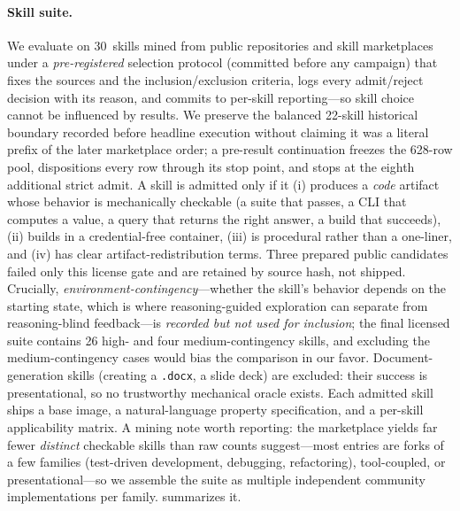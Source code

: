 \documentclass[acmsmall,screen,review,anonymous]{acmart}
\newcommand{\NumSkills}{30}                  %
\begin{document}
\paragraph{Skill suite.} We evaluate on \NumSkills\ skills mined from public
repositories and skill marketplaces under a \emph{pre-registered} selection protocol
(committed before any campaign) that fixes the sources and the inclusion/exclusion
criteria, logs every admit/reject decision with its reason, and commits to per-skill
reporting---so skill choice cannot be influenced by results. We preserve the balanced
22-skill historical boundary recorded before headline execution without claiming it was
a literal prefix of the later marketplace order; a pre-result continuation freezes the
628-row pool, dispositions every row through its stop point, and stops at the eighth
additional strict admit. A skill is admitted only if
it (i) produces a \emph{code} artifact whose behavior is mechanically checkable (a suite
that passes, a CLI that computes a value, a query that returns the right answer, a build
that succeeds), (ii) builds in a credential-free container, (iii) is procedural
rather than a one-liner, and (iv) has clear artifact-redistribution terms. Three
prepared public candidates failed only this license gate and are retained by source
hash, not shipped. Crucially, \emph{environment-contingency}---whether the skill's
behavior depends on the starting state, which is where reasoning-guided exploration can
separate from reasoning-blind feedback---is \emph{recorded but not used for inclusion};
the final licensed suite contains 26 high- and four medium-contingency skills, and
excluding the medium-contingency cases would bias the comparison in our favor. Document-%
generation skills (creating a \texttt{.docx}, a slide deck) are excluded: their success
is presentational, so no trustworthy mechanical oracle exists. Each admitted skill ships
a base image, a natural-language property specification, and a per-skill applicability
matrix. A mining note worth reporting: the marketplace yields far fewer \emph{distinct}
checkable skills than raw counts suggest---most entries are forks of a few families
(test-driven development, debugging, refactoring), tool-coupled, or presentational---so
we assemble the suite as multiple independent community implementations per family.
 summarizes it.
\end{document}
